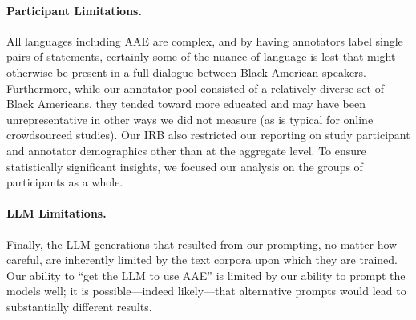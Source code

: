 \paragraph{Participant Limitations.}
All languages including AAE are complex, and by having annotators label single pairs of statements, certainly some of the nuance of language is lost that might otherwise be present in a full dialogue between Black American speakers. Furthermore, while our annotator pool consisted of a relatively diverse set of Black Americans, they tended toward more educated and may have been unrepresentative in other ways we did not measure (as is typical for online crowdsourced studies). Our IRB also restricted our reporting on study participant and annotator demographics other than at the aggregate level. To ensure statistically significant insights, we focused our analysis on the groups of participants as a whole. 

\paragraph{LLM Limitations.} 
Finally, the LLM generations that resulted from our prompting, no matter how careful, are inherently limited by the text corpora upon which they are trained. Our ability to ``get the LLM to use AAE'' is limited by our ability to prompt the models well; it is possible---indeed likely---that alternative prompts would lead to substantially different results.


